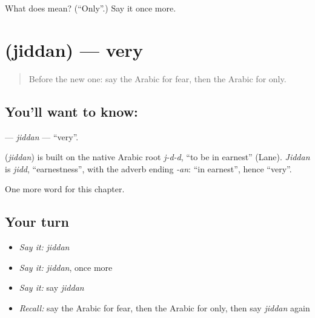 \begin{tcolorbox}[breakable,colback=teal!4,colframe=teal!35!black,title={Before you move on}]
What does  mean? (\textquotedblleft{}Only\textquotedblright{}.) Say it once more.
\end{tcolorbox}
\section[\texorpdfstring{\ar{جدا} (jiddan)}{جدا (jiddan)}]{ (jiddan) — very}

\label{lesson:AR-C207-jiddan}



\begin{quote}
Before the new one: say the Arabic for fear, then the Arabic for only.
\end{quote}

\subsection*{You'll want to know: }
\textbf{} — \emph{jiddan} — \textquotedblleft{}very\textquotedblright{}.

\begin{cousinweb}
\textbf{} (\emph{jiddan}) is built on the native Arabic root \emph{j-d-d}, \textquotedblleft{}to be in earnest\textquotedblright{} (Lane). \emph{Jiddan} is \emph{jidd}, \textquotedblleft{}earnestness\textquotedblright{}, with the adverb ending \emph{-an}: \textquotedblleft{}in earnest\textquotedblright{}, hence \textquotedblleft{}very\textquotedblright{}.
\end{cousinweb}

\begin{grammarlens}[title={What you've built}]
One more word for this chapter.
\end{grammarlens}

\subsection*{Your turn}
\begin{itemize}
\raggedright
  \item \emph{Say it:} \emph{jiddan}
  \item \emph{Say it:} \emph{jiddan}, once more
  \item \emph{Say it:} say \emph{jiddan}
  \item \emph{Recall:} say the Arabic for fear, then the Arabic for only, then say \emph{jiddan} again
\end{itemize}

